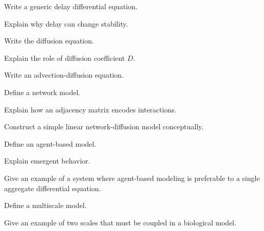 \begin{exercise}[2]
Write a generic delay differential equation.
\end{exercise}

\begin{exercise}[3]
Explain why delay can change stability.
\end{exercise}

\begin{exercise}[2]
Write the diffusion equation.
\end{exercise}

\begin{exercise}[2]
Explain the role of diffusion coefficient \(D\).
\end{exercise}

\begin{exercise}[3]
Write an advection-diffusion equation.
\end{exercise}

\begin{exercise}[2]
Define a network model.
\end{exercise}

\begin{exercise}[3]
Explain how an adjacency matrix encodes interactions.
\end{exercise}

\begin{exercise}[3]
Construct a simple linear network-diffusion model conceptually.
\end{exercise}

\begin{exercise}[2]
Define an agent-based model.
\end{exercise}

\begin{exercise}[3]
Explain emergent behavior.
\end{exercise}

\begin{exercise}[3]
Give an example of a system where agent-based modeling is preferable to a
single aggregate differential equation.
\end{exercise}

\begin{exercise}[2]
Define a multiscale model.
\end{exercise}

\begin{exercise}[3]
Give an example of two scales that must be coupled in a biological model.
\end{exercise}

